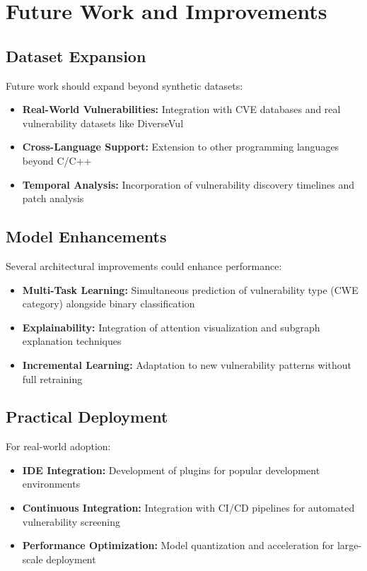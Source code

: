 \section{Future Work and Improvements}

\subsection{Dataset Expansion}

Future work should expand beyond synthetic datasets:
\begin{itemize}
\item \textbf{Real-World Vulnerabilities:} Integration with CVE databases and real vulnerability datasets like DiverseVul
\item \textbf{Cross-Language Support:} Extension to other programming languages beyond C/C++
\item \textbf{Temporal Analysis:} Incorporation of vulnerability discovery timelines and patch analysis
\end{itemize}

\subsection{Model Enhancements}

Several architectural improvements could enhance performance:
\begin{itemize}
\item \textbf{Multi-Task Learning:} Simultaneous prediction of vulnerability type (CWE category) alongside binary classification
\item \textbf{Explainability:} Integration of attention visualization and subgraph explanation techniques
\item \textbf{Incremental Learning:} Adaptation to new vulnerability patterns without full retraining
\end{itemize}

\subsection{Practical Deployment}

For real-world adoption:
\begin{itemize}
\item \textbf{IDE Integration:} Development of plugins for popular development environments
\item \textbf{Continuous Integration:} Integration with CI/CD pipelines for automated vulnerability screening
\item \textbf{Performance Optimization:} Model quantization and acceleration for large-scale deployment
\end{itemize}

